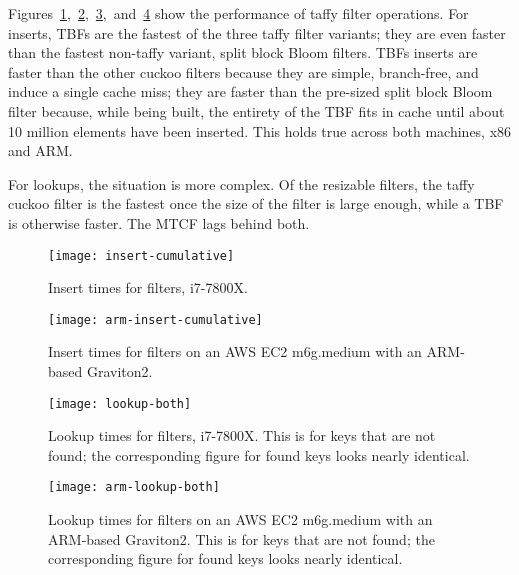 \documentclass[letterpaper,twocolumn,10pt]{article}
\begin{document}
Figures~\ref{insert-time},~\ref{arm-insert-time},~\ref{lookup-both},~and~\ref{arm-lookup-both} show the performance of taffy filter operations.
For inserts, TBFs are the fastest of the three taffy filter variants; they are even faster than the fastest non-taffy variant, split block Bloom filters.
TBFs inserts are faster than the other cuckoo filters because they are simple, branch-free, and induce a single cache miss; they are faster than the pre-sized split block Bloom filter because, while being built, the entirety of the TBF fits in cache until about 10 million elements have been inserted.
This holds true across both machines, x86 and ARM.

For lookups, the situation is more complex.
Of the resizable filters, the taffy cuckoo filter is the fastest once the size of the filter is large enough, while a TBF is otherwise faster.
The MTCF lags behind both.

\begin{figure}
  \texttt{[image: insert-cumulative]}
  \caption{
    \label{insert-time}
    Insert times for filters, i7-7800X.
  }
\end{figure}

\begin{figure}
  \texttt{[image: arm-insert-cumulative]}
  \caption{
    \label{arm-insert-time}
    Insert times for filters on an AWS EC2 m6g.medium with an ARM-based Graviton2.
  }
\end{figure}

\begin{figure}
  \texttt{[image: lookup-both]}
  \caption{
    \label{lookup-both}
    Lookup times for filters, i7-7800X.
    This is for keys that are not found; the corresponding figure for found keys looks nearly identical.
  }
\end{figure}

\begin{figure}
  \texttt{[image: arm-lookup-both]}
  \caption{
    \label{arm-lookup-both}
    Lookup times for filters on an AWS EC2 m6g.medium with an ARM-based Graviton2.
    This is for keys that are not found; the corresponding figure for found keys looks nearly identical.
  }
\end{figure}
\end{document}
